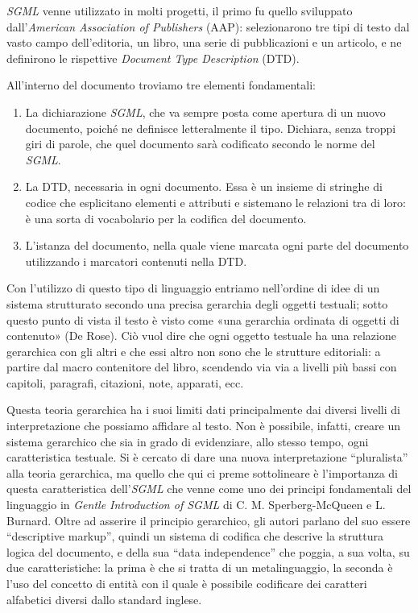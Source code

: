 \documentclass[
  b5paper,
  twoside,
  11pt,
  chapterprefix=false,
  bibliography=totocnumbered,
  parskip=0]{scrbook}
\begin{document}
\emph{SGML} venne utilizzato in molti progetti, il primo fu quello sviluppato
dall'\emph{American Association of Publishers} (AAP): selezionarono tre tipi
di testo dal vasto campo dell'editoria, un libro, una serie di
pubblicazioni e un articolo, e ne definirono le rispettive \emph{Document
Type Description} (DTD).

All'interno del documento troviamo tre elementi fondamentali:

\begin{enumerate}
\def\labelenumi{\arabic{enumi}.}
\item
  La dichiarazione \emph{SGML}, che va sempre posta come apertura di un
  nuovo documento, poiché ne definisce letteralmente il tipo.
  Dichiara, senza troppi giri di parole, che quel documento sarà
  codificato secondo le norme del \emph{SGML}.
\item
  La DTD, necessaria in ogni documento. Essa è un insieme di stringhe
  di codice che esplicitano elementi e attributi e sistemano le
  relazioni tra di loro: è una sorta di vocabolario per la codifica
  del documento.
\item
  L'istanza del documento, nella quale viene marcata ogni parte del
  documento utilizzando i marcatori contenuti nella DTD.
\end{enumerate}

Con l'utilizzo di questo tipo di linguaggio entriamo nell'ordine di idee
di un sistema strutturato secondo una precisa gerarchia degli oggetti
testuali; sotto questo punto di vista il testo è visto come «una
gerarchia ordinata di oggetti di contenuto» (De Rose). Ciò vuol dire che
ogni oggetto testuale ha una relazione gerarchica con gli altri e che
essi altro non sono che le strutture editoriali: a partire dal macro
contenitore del libro, scendendo via via a livelli più bassi con
capitoli, paragrafi, citazioni, note, apparati, ecc.

Questa teoria gerarchica ha i suoi limiti dati principalmente dai
diversi livelli di interpretazione che possiamo affidare al testo. Non è
possibile, infatti, creare un sistema gerarchico che sia in grado di
evidenziare, allo stesso tempo, ogni caratteristica testuale. Si è
cercato di dare una nuova interpretazione \enquote{pluralista} alla teoria
gerarchica, ma quello che qui ci preme sottolineare è l'importanza di
questa caratteristica dell'\emph{SGML} che venne come uno dei principi
fondamentali del linguaggio in \emph{Gentle Introduction of SGML} di C. M.
Sperberg-McQueen e L. Burnard. Oltre ad asserire il principio
gerarchico, gli autori parlano del suo essere \enquote{descriptive markup},
quindi un sistema di codifica che descrive la struttura logica del
documento, e della sua \enquote{data independence} che poggia, a sua volta, su
due caratteristiche: la prima è che si tratta di un metalinguaggio, la
seconda è l'uso del concetto di entità con il quale è possibile
codificare dei caratteri alfabetici diversi dallo standard inglese.
\end{document}
